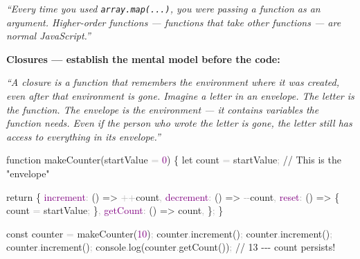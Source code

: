 \documentclass[
  justified,
  openright,
]{tufte-book}
\newcommand{\BuiltInTok}[1]{#1}
\newcommand{\CommentTok}[1]{\textcolor{MidGray}{#1}}
\newcommand{\ControlFlowTok}[1]{\textcolor{BrandBlue}{#1}}
\newcommand{\DataTypeTok}[1]{\textcolor{Purple}{#1}}
\newcommand{\DecValTok}[1]{\textcolor{Purple}{#1}}
\newcommand{\FunctionTok}[1]{\textcolor{BrandBlue}{#1}}
\newcommand{\KeywordTok}[1]{\textcolor{BrandBlue}{#1}}
\newcommand{\NormalTok}[1]{#1}
\newcommand{\OperatorTok}[1]{\textcolor{DarkGray}{#1}}
\newenvironment{Shaded}{%
  \begin{snugshade}
}{%
  \end{snugshade}
}
\begin{document}
\emph{``Every time you used \texttt{array.map(...)}, you were passing a
function as an argument. Higher-order functions --- functions that take
other functions --- are normal JavaScript.''}

\textbf{Closures --- establish the mental model before the code:}

\emph{``A closure is a function that remembers the environment where it
was created, even after that environment is gone. Imagine a letter in an
envelope. The letter is the function. The envelope is the environment
--- it contains variables the function needs. Even if the person who
wrote the letter is gone, the letter still has access to everything in
its envelope.''}

\begin{Shaded}
\begin{Highlighting}[]
\KeywordTok{function} \FunctionTok{makeCounter}\NormalTok{(startValue }\OperatorTok{=} \DecValTok{0}\NormalTok{) \{}
  \KeywordTok{let}\NormalTok{ count }\OperatorTok{=}\NormalTok{ startValue}\OperatorTok{;} \CommentTok{// This is the "envelope"}

  \ControlFlowTok{return}\NormalTok{ \{}
    \DataTypeTok{increment}\OperatorTok{:}\NormalTok{ () }\KeywordTok{=\textgreater{}} \OperatorTok{++}\NormalTok{count}\OperatorTok{,}
    \DataTypeTok{decrement}\OperatorTok{:}\NormalTok{ () }\KeywordTok{=\textgreater{}} \OperatorTok{{-}{-}}\NormalTok{count}\OperatorTok{,}
    \DataTypeTok{reset}\OperatorTok{:}\NormalTok{ () }\KeywordTok{=\textgreater{}}\NormalTok{ \{}
\NormalTok{      count }\OperatorTok{=}\NormalTok{ startValue}\OperatorTok{;}
\NormalTok{    \}}\OperatorTok{,}
    \DataTypeTok{getCount}\OperatorTok{:}\NormalTok{ () }\KeywordTok{=\textgreater{}}\NormalTok{ count}\OperatorTok{,}
\NormalTok{  \}}\OperatorTok{;}
\NormalTok{\}}

\KeywordTok{const}\NormalTok{ counter }\OperatorTok{=} \FunctionTok{makeCounter}\NormalTok{(}\DecValTok{10}\NormalTok{)}\OperatorTok{;}
\NormalTok{counter}\OperatorTok{.}\FunctionTok{increment}\NormalTok{()}\OperatorTok{;}
\NormalTok{counter}\OperatorTok{.}\FunctionTok{increment}\NormalTok{()}\OperatorTok{;}
\NormalTok{counter}\OperatorTok{.}\FunctionTok{increment}\NormalTok{()}\OperatorTok{;}
\BuiltInTok{console}\OperatorTok{.}\FunctionTok{log}\NormalTok{(counter}\OperatorTok{.}\FunctionTok{getCount}\NormalTok{())}\OperatorTok{;} \CommentTok{// 13 {-}{-}{-} count persists!}
\end{Highlighting}
\end{Shaded}
\end{document}
